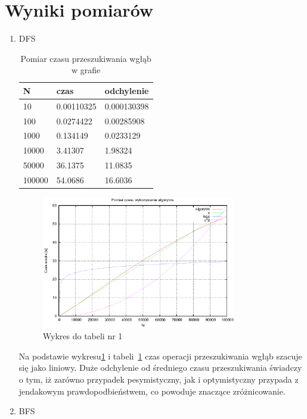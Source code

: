 \documentclass[a4paper,11pt]{article}
\begin{document}
\section{Wyniki pomiarów}
\begin{enumerate}
 \item DFS
   
  \begin{table}[th]
  \centering
    \caption{Pomiar czasu przeszukiwania wgłąb w grafie}

      \begin{tabular}{|l|l|l|}
	\hline
	N & czas & odchylenie \\
    \hline
 10 & 0.00110325 & 0.000130398\\
 \hline
100 & 0.0274422 & 0.00285908\\
\hline
1000 & 0.134149 & 0.0233129\\
\hline
10000 & 3.41307 & 1.98324\\
\hline
50000 & 36.1375 & 11.0835\\
\hline
100000 & 54.0686 & 16.6036\\
\hline
    \end{tabular}
    \label{tab1}
    \end{table}
    \newpage
 \begin{figure}[th]
\centering
\includegraphics[width=0.8\textwidth]{../prj/wykres13.eps}
\caption{Wykres do tabeli nr 1}
\label{Wykres1}
\end{figure} 
Na podstawie wykresu\ref{Wykres1} i tabeli~\ref{tab1} czas operacji przeszukiwania wgłąb szacuje się jako liniowy. Duże odchylenie od średniego czasu przeszukiwania świadczy o tym,
 iż zarówno przypadek pesymistyczny, jak i optymistyczny przypada z jendakowym prawdopodbieństwem, co powoduje znaczące zróżnicowanie.
\item BFS
  \begin{table}[th]
  \centering
  

\end{table}
\end{enumerate}
\end{document}
